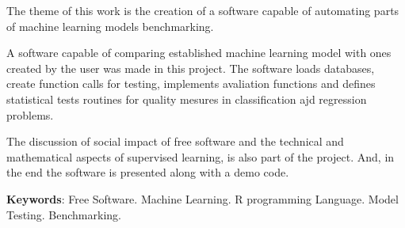


\begin{resumo}[Abstract]
The theme of this work is the creation of a software capable of automating parts of machine learning models benchmarking.

A software capable of comparing established machine learning model  with ones created by the user was made in this project. The software loads databases, create function calls for testing, implements avaliation functions and defines statistical tests routines for quality mesures in classification ajd regression problems.

The discussion of social impact of free software and the technical and mathematical aspects of supervised learning, is also part of the project. And, in the end the software is presented along with a demo code.

\textbf{Keywords}: Free Software. Machine Learning. R programming Language. Model Testing. Benchmarking.


\end{resumo}



